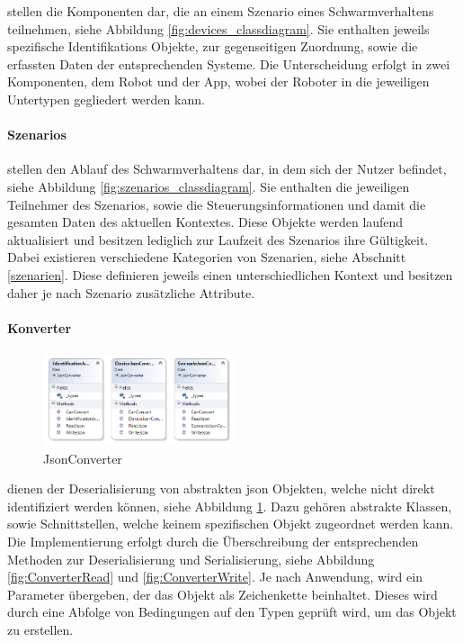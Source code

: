 stellen die Komponenten dar, die an einem Szenario eines Schwarmverhaltens teilnehmen, siehe Abbildung \ref{fig:devices_classdiagram}. Sie enthalten jeweils spezifische Identifikations Objekte, zur gegenseitigen Zuordnung, sowie die erfassten Daten der entsprechenden Systeme. Die Unterscheidung erfolgt in zwei Komponenten, dem Robot und der App, wobei der Roboter in die jeweiligen Untertypen gegliedert werden kann. 

\paragraph{Szenarios}

stellen den Ablauf des Schwarmverhaltens dar, in dem sich der Nutzer befindet, siehe Abbildung \ref{fig:szenarios_classdiagram}. Sie enthalten die jeweiligen Teilnehmer des Szenarios, sowie die Steuerungsinformationen und damit die gesamten Daten des aktuellen Kontextes. Diese Objekte werden laufend aktualisiert und besitzen lediglich zur Laufzeit des Szenarios ihre Gültigkeit. Dabei existieren verschiedene Kategorien von Szenarien, siehe Abschnitt \ref{szenarien}. Diese definieren jeweils einen unterschiedlichen Kontext und besitzen daher je nach Szenario zusätzliche Attribute.

\newpage
\paragraph{Konverter}

\begin{figure}
	\begin{center}
		\includegraphics[width=0.5\textwidth]{images/uml/json_converter.png}
	\end{center}
	\caption{JsonConverter}
	\label{fig:converter_classdiagram}
\end{figure}

dienen der Deserialisierung von abstrakten \gls{json} Objekten, welche nicht direkt identifiziert werden können, siehe Abbildung \ref{fig:converter_classdiagram}. Dazu gehören abstrakte Klassen, sowie Schnittstellen, welche keinem spezifischen Objekt zugeordnet werden kann. Die Implementierung erfolgt durch die Überschreibung der entsprechenden Methoden zur Deserialisierung und Serialisierung, siehe Abbildung \ref{fig:ConverterRead} und \ref{fig:ConverterWrite}. Je nach Anwendung, wird ein Parameter übergeben, der das Objekt als Zeichenkette beinhaltet. Dieses wird durch eine Abfolge von Bedingungen auf den Typen geprüft wird, um das Objekt zu erstellen.\\

